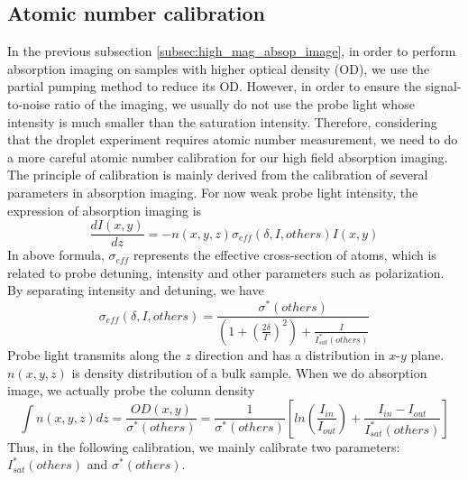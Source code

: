 \subsection{Atomic number calibration}

In the previous subsection \ref{subsec:high_mag_absop_image}, in order to perform absorption imaging on samples with higher optical density (OD), we use the partial pumping method to reduce its OD. However, in order to ensure the signal-to-noise ratio of the imaging, we usually do not use the probe light whose intensity is much smaller than the saturation intensity. Therefore, considering that the droplet experiment requires atomic number measurement, we need to do a more careful atomic number calibration for our high field absorption imaging. The principle of calibration is mainly derived from the calibration of several parameters in absorption imaging. For now weak probe light intensity, the expression of absorption imaging is
\begin{equation}
\frac{dI(x,y)}{dz}=-n(x,y,z)\sigma_{eff}(\delta,I,others)I(x,y)
\end{equation}
In above formula, $\sigma_{eff}$ represents the effective cross-section of atoms, which is related to probe detuning, intensity and other parameters such as polarization. By separating intensity and detuning, we have
\begin{equation}
\sigma_{eff}(\delta,I,others)=\frac{\sigma^*(others)}{(1+(\frac{2\delta}{\Gamma})^2)+\frac{I}{I^*_{sat}(others)}}
\end{equation}
Probe light transmits along the $z$ direction and has a distribution in $x$-$y$ plane. $n(x,y,z)$ is density distribution of a bulk sample. When we do absorption image, we actually probe the column density
\begin{equation}
\label{sat_absorp_formula}
\int n(x,y,z)dz=\frac{OD(x,y)}{\sigma^*(others)}=\frac{1}{\sigma^*(others)}[ln(\frac{I_{in}}{I_{out}})+\frac{I_{in}-I_{out}}{I^*_{sat}(others)}]
\end{equation}
Thus, in the following calibration, we mainly calibrate two parameters: $I^*_{sat}(others)$ and $\sigma^*(others)$.

